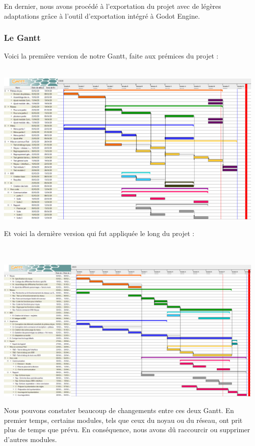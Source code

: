 \documentclass[a4paper,11pt]{article}
\begin{document}
En dernier, nous avons procédé à l’exportation du projet avec de légères adaptations grâce à l’outil d'exportation intégré à Godot Engine.


\subsubsection{Le Gantt}
Voici la première version de notre Gantt, faite aux prémices du projet :\\\\
\begin{center}
	\includegraphics[width=14cm]{Img/image6.png} \\
\end{center}


Et voici la dernière version qui fut appliquée le long du projet : \\\\\\
\begin{center}
	\includegraphics[width=14cm]{Img/image2.png}
\end{center}


Nous pouvons constater beaucoup de changements entre ces deux Gantt. En premier temps, certains modules, tels que ceux du noyau ou du réseau, ont prit plus de temps que prévu. En conséquence, nous avons dû raccourcir ou supprimer d’autres modules. \\
\end{document}
